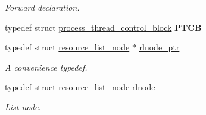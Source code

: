 \begin{DoxyCompactItemize}
\begin{DoxyCompactList}\small\item\em Forward declaration. \end{DoxyCompactList}\item 
\mbox{\label{group__rlists_ga2115e4c199a702aaf36f4571877bf013}} 
typedef struct \hyperlink{structprocess__thread__control__block}{process\+\_\+thread\+\_\+control\+\_\+block} {\bfseries P\+T\+CB}
\item 
\mbox{\label{group__rlists_gaae2ea9be18d20f0c80a62a2f8e2eed4d}} 
typedef struct \hyperlink{structresource__list__node}{resource\+\_\+list\+\_\+node} $\ast$ \hyperlink{group__rlists_gaae2ea9be18d20f0c80a62a2f8e2eed4d}{rlnode\+\_\+ptr}
\begin{DoxyCompactList}\small\item\em A convenience typedef. \end{DoxyCompactList}\item 
\mbox{\label{group__rlists_ga8f6244877f7ce2322c90525217ea6e7a}} 
typedef struct \hyperlink{structresource__list__node}{resource\+\_\+list\+\_\+node} \hyperlink{group__rlists_ga8f6244877f7ce2322c90525217ea6e7a}{rlnode}
\begin{DoxyCompactList}\small\item\em List node. \end{DoxyCompactList}\end{DoxyCompactItemize}
